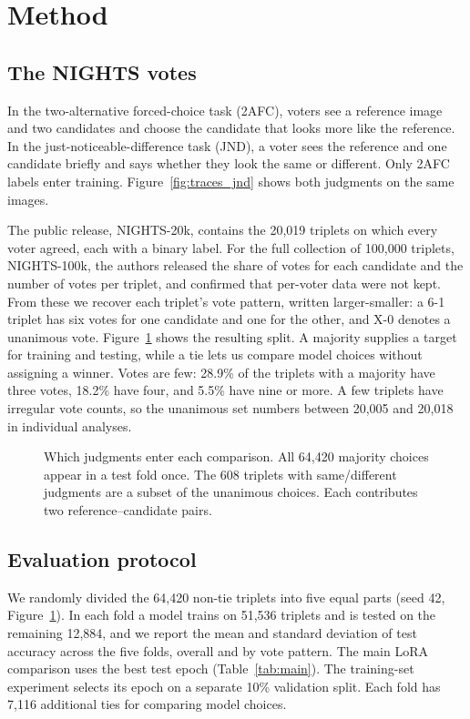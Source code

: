 \documentclass{article}
\begin{document}
\section{Method}

\subsection{The NIGHTS votes}

In the two-alternative forced-choice task (2AFC), voters see a reference image and two candidates and choose the candidate that looks more like the reference. In the just-noticeable-difference task (JND), a voter sees the reference and one candidate briefly and says whether they look the same or different. Only 2AFC labels enter training. Figure~\ref{fig:traces_jnd} shows both judgments on the same images.

The public release, NIGHTS-20k, contains the 20{,}019 triplets on which every voter agreed, each with a binary label. For the full collection of 100{,}000 triplets, NIGHTS-100k, the authors released the share of votes for each candidate and the number of votes per triplet, and confirmed that per-voter data were not kept. From these we recover each triplet's vote pattern, written larger-smaller: a 6-1 triplet has six votes for one candidate and one for the other, and X-0 denotes a unanimous vote. Figure~\ref{fig:study} shows the resulting split. A majority supplies a target for training and testing, while a tie lets us compare model choices without assigning a winner. Votes are few: 28.9\% of the triplets with a majority have three votes, 18.2\% have four, and 5.5\% have nine or more. A few triplets have irregular vote counts, so the unanimous set numbers between 20{,}005 and 20{,}018 in individual analyses.

\begin{figure}[!htbp]
\centering
\studyflow
\caption{Which judgments enter each comparison. All 64{,}420 majority choices appear in a test fold once. The 608 triplets with same/different judgments are a subset of the unanimous choices. Each contributes two reference--candidate pairs.}
\label{fig:study}
\end{figure}

\subsection{Evaluation protocol}

We randomly divided the 64{,}420 non-tie triplets into five equal parts (seed 42, Figure~\ref{fig:study}). In each fold a model trains on 51{,}536 triplets and is tested on the remaining 12{,}884, and we report the mean and standard deviation of test accuracy across the five folds, overall and by vote pattern. The main LoRA comparison uses the best test epoch (Table~\ref{tab:main}). The training-set experiment selects its epoch on a separate 10\% validation split. Each fold has 7{,}116 additional ties for comparing model choices.
\end{document}
